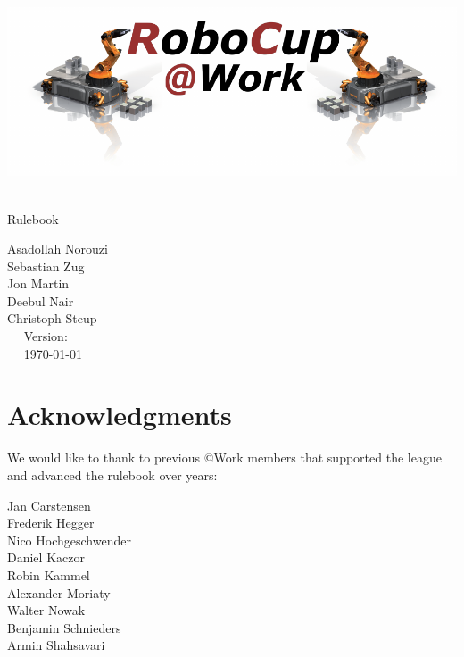 
\begin{titlepage}
  \begin{center}
    {

      \includegraphics[width=\textwidth]{images/logo_RoboCupAtWork.pdf}\\[1.23ex]
    }
    \vspace{2.7 cm}
    \hrulefill\par
    {%
      \vspace*{.27cm}
      \Huge{\RCAW}\\[1.23ex]
      \Large Rulebook \\[2ex]
    }

    \hrulefill\par


    \vfill
    Asadollah Norouzi\\
  	Sebastian Zug\\
    Jon Martin \\
    Deebul Nair \\
    Christoph Steup \\
    \vfill
    ~~ Version: \YEAR ~~ \\
    ~~  \today ~~ \\
  \end{center}

\newpage

\section*{Acknowledgments}

We would like to thank to previous @Work members that supported the league and
advanced the rulebook over years:

Jan Carstensen \\
Frederik Hegger\\
Nico Hochgeschwender \\
Daniel Kaczor \\
Robin Kammel \\
Alexander Moriaty \\
Walter Nowak \\
Benjamin Schnieders\\
Armin Shahsavari \\


\end{titlepage}
